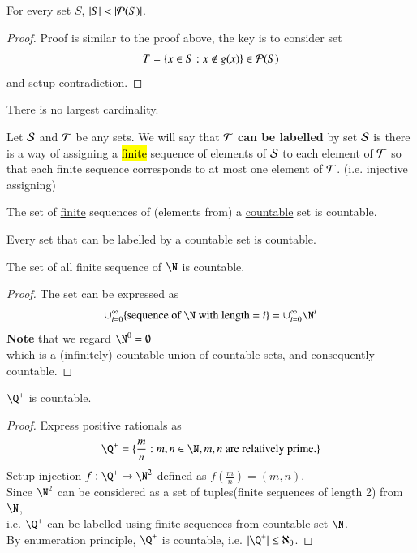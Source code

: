 \documentclass[10pt]{article}
\begin{document}
		\begin{theorem}[10.3.27]
			For every set $S$, $|S| < |\mathcal{{P}}(S)|$.
			\begin{proof}
				Proof is similar to the proof above, the key is to consider set
				\[
					T = \{x \in S: x \notin g(x)\} \in \mathcal{{P}}(S)
				\]
				and setup contradiction.
			\end{proof}
		\end{theorem}
		
		\begin{corollary}
			There is no largest cardinality.
		\end{corollary}
		
		\begin{definition}[10.3.14]
			Let $\mathcal{{S}}$ and $\mathcal{{T}}$ be any sets. We will say that $\mathcal{{T}}$ \textbf{can be labelled} by set $\mathcal{{S}}$ is there is a way of assigning a \hl{finite} sequence of elements of $\mathcal{{S}}$ to each element of $\mathcal{{T}}$ so that each finite sequence corresponds to at most one element of $\mathcal{{T}}$. (i.e. injective assigning)
		\end{definition}
		
		\begin{theorem}
			The set of \ul{finite} sequences of (elements from) a \ul{countable} set is countable.
		\end{theorem}
		
		\begin{theorem}
			Every set that can be labelled by a countable set is countable.
		\end{theorem}
		
		\begin{example}
			The set of all finite sequence of $\N$ is countable.
			\begin{proof}
				The set can be expressed as 
				\[
					\cup_{i=0}^{\infty} \{\tx{sequence of } \N \tx{ with length = }i\} = \cup_{i=0}^\infty \N^i
				\]
				\textbf{Note} that we regard $\N^0 = \emptyset$ \\
				which is a (infinitely) countable union of countable sets, and consequently countable. 
			\end{proof}
		\end{example}
		
		\begin{example}
			$\Q^+$ is countable.
			\begin{proof}
				Express positive rationals as 
				\[
					\Q^+ = \{\frac{m}{n}:m, n \in \N, m, n \tx{ are relatively prime.}\}
				\]
				Setup injection $f: \Q^+ \to \N^2$ defined as $f(\frac{m}{n}) = (m,n)$. \\
				Since $\N^2$ can be considered as a set of tuples(finite sequences of length 2) from $\N$,\\
				i.e. $\Q^+$ can be labelled using finite sequences from countable set $\N$. \\
				By enumeration principle, $\Q^+$ is countable, i.e. $|\Q^+| \leq \aleph_0$. 
			\end{proof}
		\end{example}
		
\end{document}
